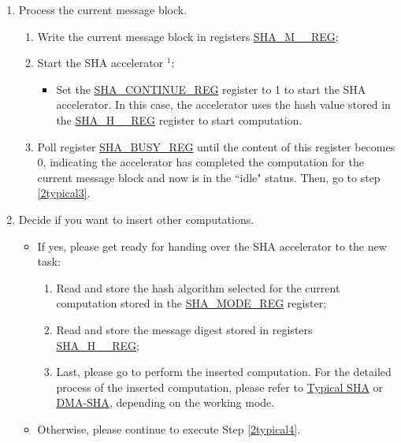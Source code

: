 \documentclass[main\_\_EN.tex]{subfiles}
\begin{document}
\begin{enumerate}
    \item Process the current message block\label{2typical2}.
        \begin{enumerate}
            \item Write the current message block in registers \hyperref[regdesc:SHAMNREG]{SHA\_M\_\_REG};
            \item Start the SHA accelerator\label{2b1} \hyperref[note1]{$^1$}:
            \begin{itemize}
                \item Set the \hyperref[regdesc:SHACONTINUEREG]{SHA\_CONTINUE\_REG} register to 1 to start the SHA accelerator. In this case, the accelerator uses the hash value stored in the \hyperref[regdesc:SHAHNREG]{SHA\_H\_\_REG} register to start computation.
            \end{itemize}
            \item Poll register \hyperref[regdesc:SHABUSYREG]{SHA\_BUSY\_REG} until the content of this register becomes 0, indicating the accelerator has completed the computation for the current message block and now is in the ``idle" status. Then, go to step \ref{2typical3}.
        \end{enumerate}
    \item \label{2typical3} Decide if you want to insert other computations.
        \begin{itemize}
            \item If yes, please get ready for handing over the SHA accelerator to the new task:
            \begin{enumerate}
            \item Read and store the hash algorithm selected for the current computation stored in the \hyperref[regdesc:SHAMODEREG]{SHA\_MODE\_REG} register;
            \item Read and store the message digest stored in registers \hyperref[regdesc:SHAHNREG]{SHA\_H\_\_REG};
            \item Last, please go to perform the inserted computation. For the detailed process of the inserted computation, please refer to \hyperref[subsection:typicalsha]{Typical SHA} or \hyperref[subsection:dma-sha]{DMA-SHA}, depending on the working mode.
            \end{enumerate}
            \item Otherwise, please continue to execute Step \ref{2typical4}.
        \end{itemize}


\end{enumerate}
\end{document}
